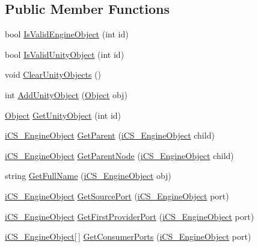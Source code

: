 \subsection*{Public Member Functions}
\begin{DoxyCompactItemize}
\item 
bool \hyperlink{classi_c_s___storage_imp_a7ed44c594c5985bd2ac6199ef0bad0be}{Is\+Valid\+Engine\+Object} (int id)
\item 
bool \hyperlink{classi_c_s___storage_imp_a98b649e6a4da55104e00736d9ccff043}{Is\+Valid\+Unity\+Object} (int id)
\item 
void \hyperlink{classi_c_s___storage_imp_a0b35410616e1f510ad3aa1945b2badab}{Clear\+Unity\+Objects} ()
\item 
int \hyperlink{classi_c_s___storage_imp_a46a9b3a5e880a1133890a7d79b71ae83}{Add\+Unity\+Object} (\hyperlink{i_c_s___logic_8cs_a5b2c8b05b9a357906d7f9e5b2c1e154d}{Object} obj)
\item 
\hyperlink{i_c_s___logic_8cs_a5b2c8b05b9a357906d7f9e5b2c1e154d}{Object} \hyperlink{classi_c_s___storage_imp_ae3f00735c047b40146a848836341973f}{Get\+Unity\+Object} (int id)
\item 
\hyperlink{classi_c_s___engine_object}{i\+C\+S\+\_\+\+Engine\+Object} \hyperlink{classi_c_s___storage_imp_aa13d0c5aba26c050a38c434d3c770f2d}{Get\+Parent} (\hyperlink{classi_c_s___engine_object}{i\+C\+S\+\_\+\+Engine\+Object} child)
\item 
\hyperlink{classi_c_s___engine_object}{i\+C\+S\+\_\+\+Engine\+Object} \hyperlink{classi_c_s___storage_imp_ad8bd7d105cbe265a6becee89993f9b7c}{Get\+Parent\+Node} (\hyperlink{classi_c_s___engine_object}{i\+C\+S\+\_\+\+Engine\+Object} child)
\item 
string \hyperlink{classi_c_s___storage_imp_a4083bede937138de905cd76a743f2a4d}{Get\+Full\+Name} (\hyperlink{classi_c_s___engine_object}{i\+C\+S\+\_\+\+Engine\+Object} obj)
\item 
\hyperlink{classi_c_s___engine_object}{i\+C\+S\+\_\+\+Engine\+Object} \hyperlink{classi_c_s___storage_imp_ad6a08ee5d1ee523a3987d36fb92e0eeb}{Get\+Source\+Port} (\hyperlink{classi_c_s___engine_object}{i\+C\+S\+\_\+\+Engine\+Object} port)
\item 
\hyperlink{classi_c_s___engine_object}{i\+C\+S\+\_\+\+Engine\+Object} \hyperlink{classi_c_s___storage_imp_a1d0a85e6d7374ae78fc0584472ed39a5}{Get\+First\+Provider\+Port} (\hyperlink{classi_c_s___engine_object}{i\+C\+S\+\_\+\+Engine\+Object} port)
\item 
\hyperlink{classi_c_s___engine_object}{i\+C\+S\+\_\+\+Engine\+Object}\mbox{[}$\,$\mbox{]} \hyperlink{classi_c_s___storage_imp_a3f2a52d45e4b256312a32cea5edf762d}{Get\+Consumer\+Ports} (\hyperlink{classi_c_s___engine_object}{i\+C\+S\+\_\+\+Engine\+Object} port)

\end{DoxyCompactItemize}
